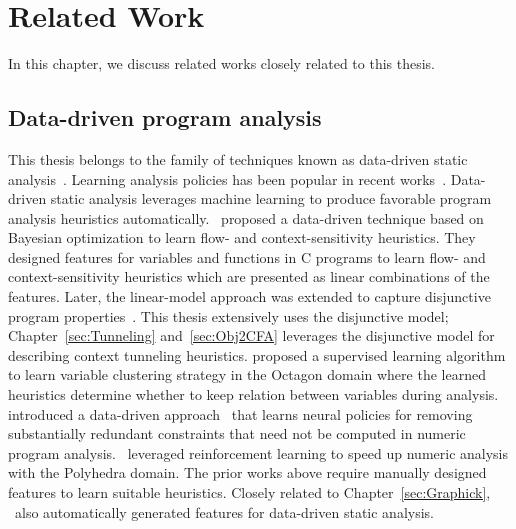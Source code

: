 \chapter{Related Work}

In this chapter, we discuss related works closely related to this thesis.




\section{Data-driven program analysis}
This thesis belongs to the family of techniques known as data-driven static analysis~\cite{Oh2015, CHA20181,cha2016learning,JeJeChOh17,heo2016unsound,He20pldi}.
Learning analysis policies has been popular in recent 
works~\cite{Bielik2017,Peleg2016,Oh2015,JeJeChOh17,Jeon2019,Singh2018cav,heo2017unsound,Heo2019resource,Grigore2016,He2020,WeiR15,Graphick20}.
Data-driven static analysis leverages machine learning to produce favorable program analysis heuristics automatically.
\cite{Oh2015}~proposed a data-driven technique based on Bayesian optimization to learn flow- and context-sensitivity heuristics.
They designed features for variables and functions in C programs to learn flow- and context-sensitivity heuristics which are presented as linear combinations of the features.
Later, the linear-model approach was extended to capture disjunctive program properties~\cite{JeJeChOh17}.
This thesis extensively uses the disjunctive model; Chapter~\ref{sec:Tunneling} and~\ref{sec:Obj2CFA} leverages the disjunctive model for describing context tunneling heuristics.
\cite{Heo2016learning} proposed a supervised learning algorithm to learn variable clustering strategy in the Octagon domain
where the learned heuristics determine whether to keep relation between variables during analysis.
\cite{He20pldi} introduced a data-driven approach \Lait~that learns neural policies for removing substantially redundant constraints that need not be computed in numeric program analysis.
\cite{Singh2018cav}~leveraged reinforcement learning to speed up numeric analysis with the Polyhedra domain.
The prior works above require manually designed features to learn suitable heuristics.
Closely related to Chapter~\ref{sec:Graphick}, \cite{ChOhHeYa17}~also automatically generated features for data-driven static analysis.

